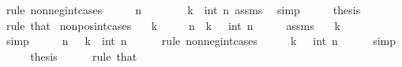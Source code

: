 \begin{isabellebody}
\ {\isacharparenleft}{\kern0pt}rule\ nonneg{\isacharunderscore}{\kern0pt}int{\isacharunderscore}{\kern0pt}cases{\isacharparenright}{\kern0pt}\isanewline
\ \ \isamarkupfalse%
\ \isamarkupfalse%
\ {\isachardoublequoteopen}n\ {\isachargreater}{\kern0pt}\ {}{\isachardoublequoteclose}\isanewline
\ \ \ \ \isamarkupfalse%
\ {\isacartoucheopen}k\ {\isacharequal}{\kern0pt}\ int\ n{\isacartoucheclose}\ assms\ \isamarkupfalse%
\ simp\isanewline
\ \ \isamarkupfalse%
\ \isamarkupfalse%
\ thesis\isanewline
\ \ \ \ \isamarkupfalse%
\ {\isacharparenleft}{\kern0pt}rule\ that{\isacharparenright}{\kern0pt}\isanewline
{}\isamarkupfalse%
%
\endisatagproof
{\isafoldproof}%
%
\isadelimproof
\isanewline
%
\endisadelimproof
\isanewline
{}\isamarkupfalse%
\ nonpos{\isacharunderscore}{\kern0pt}int{\isacharunderscore}{\kern0pt}cases{\isacharcolon}{\kern0pt}\isanewline
\ \ \ {\isachardoublequoteopen}k\ {\isasymle}\ {}{\isachardoublequoteclose}\isanewline
\ \ \ n\ \ {\isachardoublequoteopen}k\ {\isacharequal}{\kern0pt}\ {\isacharminus}{\kern0pt}\ int\ n{\isachardoublequoteclose}\isanewline
%
\isadelimproof
%
\endisadelimproof
%
\isatagproof
{}\isamarkupfalse%
\ {\isacharminus}{\kern0pt}\isanewline
\ \ \isamarkupfalse%
\ assms\ \isamarkupfalse%
\ {\isachardoublequoteopen}{\isacharminus}{\kern0pt}\ k\ {\isasymge}\ {}{\isachardoublequoteclose}\isanewline
\ \ \ \ \isamarkupfalse%
\ simp\isanewline
\ \ \isamarkupfalse%
\ \isamarkupfalse%
\ n\ \ {\isachardoublequoteopen}{\isacharminus}{\kern0pt}\ k\ {\isacharequal}{\kern0pt}\ int\ n{\isachardoublequoteclose}\isanewline
\ \ \ \ \isamarkupfalse%
\ {\isacharparenleft}{\kern0pt}rule\ nonneg{\isacharunderscore}{\kern0pt}int{\isacharunderscore}{\kern0pt}cases{\isacharparenright}{\kern0pt}\isanewline
\ \ \isamarkupfalse%
\ \isamarkupfalse%
\ {\isachardoublequoteopen}k\ {\isacharequal}{\kern0pt}\ {\isacharminus}{\kern0pt}\ int\ n{\isachardoublequoteclose}\isanewline
\ \ \ \ \isamarkupfalse%
\ simp\isanewline
\ \ \isamarkupfalse%
\ \isamarkupfalse%
\ thesis\isanewline
\ \ \ \ \isamarkupfalse%
\ {\isacharparenleft}{\kern0pt}rule\ that{\isacharparenright}{\kern0pt}\isanewline
{}\isamarkupfalse%

\end{isabellebody}

